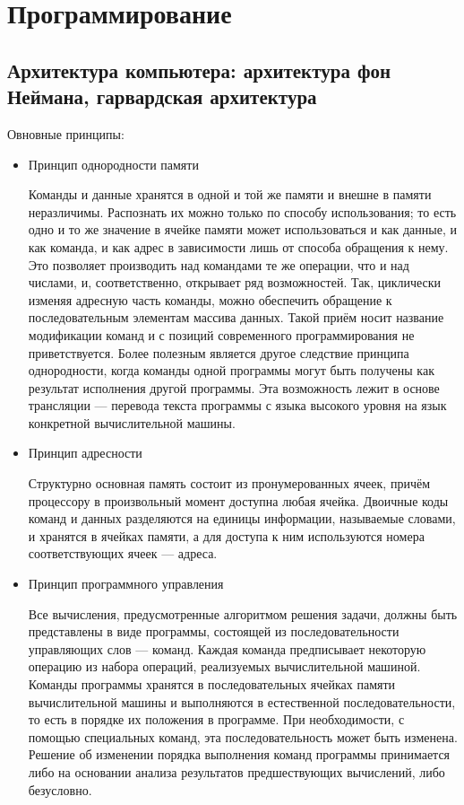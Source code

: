 \documentclass{article}
\begin{document}
\section{Программирование}
\subsection{Архитектура компьютера: архитектура фон Неймана, гарвардская
архитектура}


Овновные принципы:
\begin{itemize}
    \item Принцип однородности памяти
    
    Команды и данные хранятся в одной и той же памяти и внешне в памяти неразличимы. Распознать их можно только по способу использования; то есть одно и то же значение в ячейке памяти может использоваться и как данные, и как команда, и как адрес в зависимости лишь от способа обращения к нему. Это позволяет производить над командами те же операции, что и над числами, и, соответственно, открывает ряд возможностей. Так, циклически изменяя адресную часть команды, можно обеспечить обращение к последовательным элементам массива данных. Такой приём носит название модификации команд и с позиций современного программирования не приветствуется. Более полезным является другое следствие принципа однородности, когда команды одной программы могут быть получены как результат исполнения другой программы. Эта возможность лежит в основе трансляции — перевода текста программы с языка высокого уровня на язык конкретной вычислительной машины.
    
    \item Принцип адресности
    
    Структурно основная память состоит из пронумерованных ячеек, причём процессору в произвольный момент доступна любая ячейка. Двоичные коды команд и данных разделяются на единицы информации, называемые словами, и хранятся в ячейках памяти, а для доступа к ним используются номера соответствующих ячеек — адреса.
    
    \item Принцип программного управления
    
    Все вычисления, предусмотренные алгоритмом решения задачи, должны быть представлены в виде программы, состоящей из последовательности управляющих слов — команд. Каждая команда предписывает некоторую операцию из набора операций, реализуемых вычислительной машиной. Команды программы хранятся в последовательных ячейках памяти вычислительной машины и выполняются в естественной последовательности, то есть в порядке их положения в программе. При необходимости, с помощью специальных команд, эта последовательность может быть изменена. Решение об изменении порядка выполнения команд программы принимается либо на основании анализа результатов предшествующих вычислений, либо безусловно.
\end{itemize}
\end{document}
